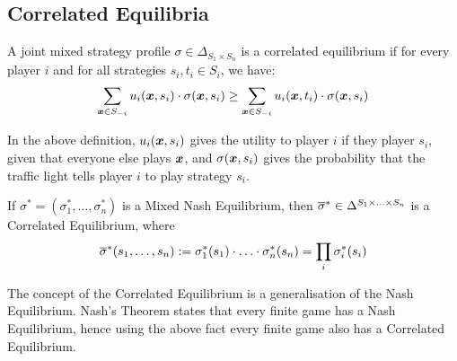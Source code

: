 \subsection{Correlated Equilibria}
	\begin{definition}
		A joint mixed strategy profile $\sigma \in \Delta_{S_1 \times S_n}$ is
		a correlated equilibrium if for every player $i$ and for all strategies
		$s_i, t_i \in S_i$, we have:
		\begin{equation*}
			\sum_{\bm{x} \in S_{-i}} u_i(\bm{x}, s_i) \cdot
			\sigma(\bm{x}, s_i) \ge \sum_{\bm{x} \in S_{-i}} u_i(\bm{x},
			t_i) \cdot \sigma(\bm{x}, s_i)
		\end{equation*}
	\end{definition}

	In the above definition, $u_i(\bm{x}, s_i)$ gives the utility to player
	$i$ if they player $s_i$, given that everyone else plays $\bm{x}$, and
	$\sigma(\bm{x}, s_i)$ gives the probability that the traffic light tells
	player $i$ to play strategy $s_i$.

	\begin{fact}
		If $\sigma^* = (\sigma^*_1, \ldots, \sigma^*_n)$ is a Mixed Nash
		Equilibrium, then $\overline{\sigma}^* \in \Delta^{S_1 \times \ldots \times
		S_n}$ is a Correlated Equilibrium, where
		\begin{equation*}
			\overline{\sigma}^* (s_1, \ldots, s_n) := \sigma^*_1 (s_1) \cdot \ldots
			\cdot \sigma^*_n (s_n) = \prod_i \sigma^*_i(s_i)
		\end{equation*}
	\end{fact}

	The concept of the Correlated Equilibrium is a generalisation of the Nash
	Equilibrium. Nash's Theorem states that every finite game has a Nash
	Equilibrium, hence using the above fact every finite game also has a
	Correlated Equilibrium.

